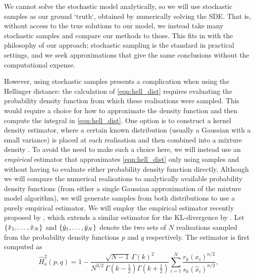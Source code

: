 We cannot solve the stochastic model analytically, so we will use stochastic samples as our ground `truth`, obtained by numerically solving the SDE. %
That is, without access to the true solutions to our model, we instead take many stochastic samples and compare our methods to those.
This fits in with the philosophy of our approach; stochastic sampling is the standard in practical settings, and we seek approximations that give the same conclusions without the computational expense.

However, using stochastic samples presents a complication when using the Hellinger distance: the calculation of \cref{eqn:hell_dist} requires evaluating the probability density function from which these realisations were sampled.
This would require a choice for how to approximate the density function and then compute the integral in \cref{eqn:hell_dist}.
One option is to construct a kernel density estimator, where a certain known distribution (usually a Gaussian with a small variance) is placed at each realisation and then combined into a mixture density \citep{Silverman_2017_DensityEstimationStatistics}.
To avoid the need to make such a choice here, we will instead use an \emph{empirical} estimator that approximates \cref{eqn:hell_dist} only using samples and without having to evaluate either probability density function directly.
Although we will compare the numerical realisations to analytically available probability density functions (from either a single Gaussian approximation of the mixture model algorithm), we will generate samples from both distributions to use a purely empirical estimator.
We will employ the empirical estimator recently proposed by \citet{DingMullhaupt_2023_EmpiricalSquaredHellinger}, which extends a similar estimator for the KL-divergence by \citet{Perez-Cruz_2008_KullbackLeiblerDivergenceEstimation}. %
Let \(\set{\hat{x}_1, \dotsc, \hat{x}_N}\) and \(\set{\hat{y}_1, \dotsc, \hat{y}_N}\) denote the two sets of \(N\) realisations sampled from the probability density functions \(p\) and \(q\) respectively.
The estimator is first computed as
\begin{equation}\label{eqn:hell_emp_Ha}
	\hat{H}_a^2\!\left(p, q\right) = 1 - \frac{\sqrt{N - 1}\,\Gamma\!\left(k\right)^2}{N^{3/2}\,\Gamma\!\left(k - \frac12\right)\Gamma\!\left(k + \frac12\right)} \sum_{i=1}^{N}\frac{r_k\!\left(x_i\right)^{n/2}}{s_k\!\left(\hat{x}_i\right)^{n/2}},
\end{equation}
